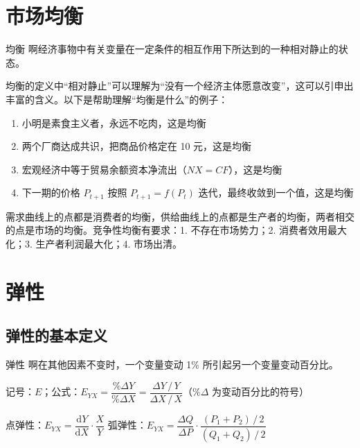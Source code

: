 \section{市场均衡}

\begin{dingyi}[breakable]{均衡}
    啊经济事物中有关变量在一定条件的相互作用下所达到的一种相对静止的状态。
\end{dingyi}

均衡的定义中“相对静止”可以理解为“没有一个经济主体愿意改变”，这可以引申出丰富的含义。以下是帮助理解“均衡是什么”的例子：

\begin{enumerate}
    \item 小明是素食主义者，永远不吃肉，这是均衡
    \item 两个厂商达成共识，把商品价格定在 10 元，这是均衡
    \item 宏观经济中等于贸易余额资本净流出（$NX=CF$），这是均衡
    \item 下一期的价格 $P_{t+1}$ 按照 $P_{t+1}=f\left(P_t\right)$ 迭代，最终收敛到一个值，这是均衡
\end{enumerate}

需求曲线上的点都是消费者的均衡，供给曲线上的点都是生产者的均衡，两者相交的点是市场的均衡。竞争性均衡有要求：1. 不存在市场势力；2. 消费者效用最大化；3. 生产者利润最大化；4. 市场出清。

\section{弹性}

\subsection{弹性的基本定义}

\begin{dingyi}[breakable]{弹性}
    啊在其他因素不变时，一个变量变动 1\% 所引起另一个变量变动百分比。
    \vspace{0.5em}
    
    记号：$E$；公式：$E_{YX}=\dfrac{\%\Delta Y}{\%\Delta X}=\dfrac{\Delta Y\,/\,Y}{\Delta X\,/\,X}$（$\%\Delta$ 为变动百分比的符号）
    \vspace{0.5em}
    
    点弹性：$E_{YX}=\dfrac{\mathrm dY}{\mathrm dX}\cdot\dfrac XY$ \quad\quad 弧弹性：$E_{YX}=\dfrac{\Delta Q}{\Delta P}\cdot\dfrac{\left(P_1+P_2\right)\,/\,2}{\left(Q_1+Q_2\right)\,/\,2}$
\end{dingyi}

